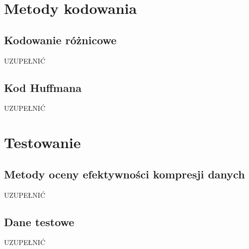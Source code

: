 \section{Metody kodowania}
\label{sec:metody}

\subsection{Kodowanie różnicowe}
\label{subsec:kodowanie_roznicowe}

\begin{enumerate} \itemsep1pt
	{\color{red} \item UZUPEŁNIĆ}
\end{enumerate}

\subsection{Kod Huffmana}
\label{subsec:kod_huffamana}

\begin{enumerate} \itemsep1pt
	{\color{red} \item UZUPEŁNIĆ}
\end{enumerate}

\section{Testowanie}
\label{sec:testowanie}

\subsection{Metody oceny efektywności kompresji danych}
\label{subsec:metody_oceny_efektywnosci_kompresji_danych}

\begin{enumerate} \itemsep1pt
	{\color{red} \item UZUPEŁNIĆ}
\end{enumerate}

\subsection{Dane testowe}
\label{subsec:dane_testowe}

\begin{enumerate} \itemsep1pt
	{\color{red} \item UZUPEŁNIĆ}
\end{enumerate}





